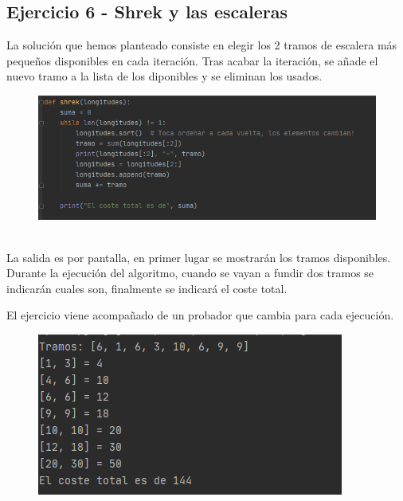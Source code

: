 \documentclass[]{report}
\begin{document}
\subsection*{Ejercicio 6 - Shrek y las escaleras}
La solución que hemos planteado consiste en elegir los 2 tramos de escalera más pequeños disponibles en cada iteración. Tras acabar la iteración, se añade el nuevo tramo a la lista de los diponibles y se eliminan los usados.\\
\begin{figure}[h!]
	\centering
	\includegraphics[width=1\linewidth]{4}
	\caption{}
	\label{fig:4}
\end{figure}\\
La salida es por pantalla, en primer lugar se mostrarán los tramos disponibles. Durante la ejecución del algoritmo, cuando se vayan a fundir dos tramos se indicarán cuales son, finalmente se indicará el coste total.

El ejercicio viene acompañado de un probador que cambia para cada ejecución.
\begin{figure}[h!]
	\centering
	\includegraphics[width=0.7\linewidth]{5}
	\caption{}
	\label{fig:5}
\end{figure}
\end{document}
